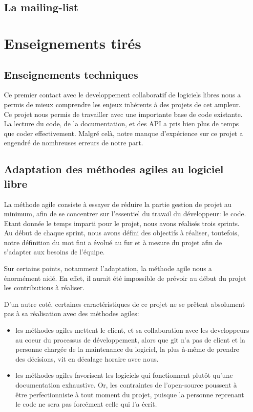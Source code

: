 \documentclass[a4paper, 12pt]{article}
\begin{document}
\subsection{La mailing-list}




\section{Enseignements tirés}

\subsection{Enseignements techniques}

Ce premier contact avec le developpement collaboratif de logiciels libres nous a permis de mieux comprendre les enjeux inhérents à des projets de cet ampleur. 
Ce projet nous permis de travailler avec une importante base de code existante. La lecture du code, de la documentation, et des API a pris bien plus de temps que coder effectivement. Malgré celà, notre manque d'expérience sur ce projet a engendré de nombreuses erreurs de notre part. 

\subsection{Adaptation des méthodes agiles au logiciel libre}

La méthode agile consiste à essayer de réduire la partie gestion de projet au minimum, afin de se concentrer sur l'essentiel du travail du développeur: le code.
Etant donnée le temps imparti pour le projet, nous avons réalisés trois sprints.
Au début de chaque sprint, nous avons défini des objectifs à réaliser, toutefois, notre définition du mot fini a évolué au fur et à mesure du projet afin de s'adapter aux besoins de l'équipe.

Sur certains points, notamment l'adaptation, la méthode agile nous a énormément aidé. En effet, il aurait été impossible de prévoir au début du projet les contributions à réaliser. 

D'un autre coté, certaines caractéristiques de ce projet ne se prêtent absolument pas à sa réalisation avec des méthodes agiles: 
\begin{itemize}
\item les méthodes agiles mettent le client, et sa collaboration avec les developpeurs au coeur du processus de développement, alors que git n'a pas de client et la personne chargée de la maintenance du logiciel, la plus à-même de prendre des décisions, vit en décalage horaire avec nous. 
\item les méthodes agiles favorisent les logiciels qui fonctionnent plutôt qu'une documentation exhaustive.
Or, les contraintes de l'open-source poussent à être perfectionniste à tout moment du projet, puisque la personne reprenant le code ne sera pas forcément celle qui l'a écrit.
\end{itemize}
\end{document}
